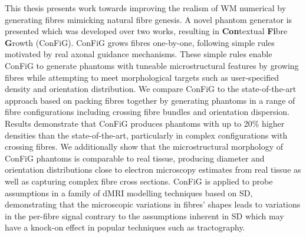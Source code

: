 This thesis presents work towards improving the realism of \ac{WM} numerical by generating fibres mimicking natural fibre genesis.
A novel phantom generator is presented which was developed over two works, resulting in \textbf{Con}textual \textbf{Fi}bre \textbf{G}rowth  (\acs{ConFiG}). \ac{ConFiG} grows fibres one-by-one, following simple rules motivated by real axonal guidance mechanisms. These simple rules enable ConFiG to generate phantoms with tuneable microstructural features by growing fibres while attempting to meet morphological targets such as user-specified density and orientation distribution. We compare ConFiG to the state-of-the-art approach based on packing fibres together by generating phantoms in a range of fibre configurations including crossing fibre bundles and orientation dispersion. Results demonstrate that ConFiG produces phantoms with up to 20\% higher densities than the state-of-the-art, particularly in complex configurations with crossing fibres. We additionally show that the microstructural morphology of ConFiG phantoms is comparable to real tissue, producing diameter and orientation distributions close to electron microscopy estimates from real tissue as well as capturing complex fibre cross sections. \ac{ConFiG} is applied to probe assumptions in a family of \ac{dMRI} modelling techniques based on \ac{SD}, demonstrating that the microscopic variations in fibres' shapes leads to variations in the per-fibre signal contrary to the assumptions inherent in \ac{SD} which may have a knock-on effect in popular techniques such as tractography.


\acresetall
